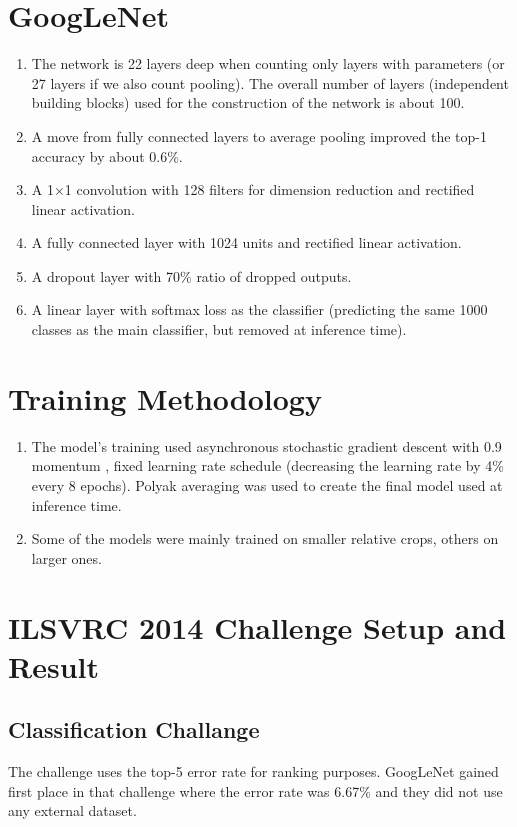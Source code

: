 \documentclass[12pt]{article}
\begin{document}
\section{GoogLeNet}
\begin{enumerate}
    \item The network is 22 layers deep when counting only layers with parameters (or 27 layers if we also count pooling). The overall number of layers (independent building blocks) used for the construction of the network is about 100.
    \item A move from fully connected layers to average pooling improved the top-1 accuracy by about 0.6\%.
    \item A 1×1 convolution with 128 filters for dimension reduction and rectified linear activation.
    \item A fully connected layer with 1024 units and rectified linear activation.
    \item A dropout layer with 70\% ratio of dropped outputs.
    \item A linear layer with softmax loss as the classifier (predicting the same 1000 classes as the main classifier, but removed at inference time).
\end{enumerate}

\section{Training Methodology}
\begin{enumerate}
    \item The model’s training used asynchronous stochastic gradient descent with 0.9 momentum \cite{sutskever2013importance}, fixed learning rate schedule (decreasing the learning rate by 4\% every 8 epochs). Polyak averaging \cite{polyak1992acceleration} was used to create the final model used at inference time.
    \item Some of the models were mainly trained on smaller relative crops, others on larger ones.
\end{enumerate}

\section{ILSVRC 2014 Challenge Setup and Result}
\subsection{Classification Challange}
The challenge uses the top-5 error rate for ranking purposes. 
GoogLeNet gained first place in that challenge where the error rate was 6.67\% and they did not use any external dataset.
\end{document}
